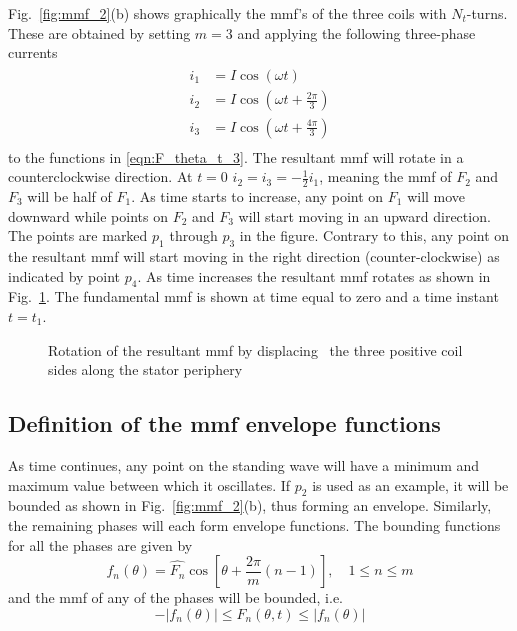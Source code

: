 Fig.~\ref{fig:mmf_2}(b) shows graphically the mmf's of the three coils with $N_t$-turns. These are obtained by setting $m=3$ and applying the following three-phase currents 
\begin{equation}
  \label{eqn:3ph_i}
  \begin{aligned}
   i_1 &= \hat{I}\cos\left(\omega t \right) \\
   i_2 &= \hat{I}\cos\left(\omega t +\frac{2\pi}{3}\right) \\
   i_3 &= \hat{I}\cos\left(\omega t +\frac{4\pi}{3}\right) \\
  \end{aligned}
\end{equation}
to the functions in \eqref{eqn:F_theta_t_3}. The resultant mmf will rotate in a counterclockwise direction. At $t=0$ $i_2=i_3=-\frac{1}{2}i_1$, meaning the mmf of $F_2$ and $F_3$ will be half of $F_1$. As time starts to increase, any point on $F_1$ will move downward while points on $F_2$ and $F_3$ will start moving in an upward direction. The points are marked $p_1$ through $p_3$ in the figure. Contrary to this, any point on the resultant mmf will start moving in the right direction (counter-clockwise) as indicated by point $p_4$. As time increases the resultant mmf rotates as shown in Fig.~\ref{fig:rotating_wave}. The fundamental mmf is shown at time equal to zero and a time instant $t=t_1$.
\begin{figure}
	\centering
		
	\caption[Rotation of the resultant mmf]{Rotation of the resultant mmf by displacing~%
	the three positive coil sides along the stator periphery}
	\label{fig:rotating_wave}
\end{figure}

\subsection{Definition of the mmf envelope functions}\label{subsec:mmf_def}
As time continues, any point on the standing wave will have a minimum and maximum value between which it oscillates. If $p_2$ is used as an example, it will be bounded as shown in Fig.~\ref{fig:mmf_2}(b), thus forming an envelope. Similarly, the remaining phases will each form envelope functions. The bounding functions for all the phases are given by
\begin{equation}
  \label{eqn:f_bound}
  f_n(\theta) = \hat{F_n}\cos\left[\theta+\frac{2\pi}{m}(n-1) \right], 
  \quad 1 \leq n \leq m
\end{equation}
and the mmf of any of the phases will be bounded, i.e. 
\begin{equation}
  -\left|f_n(\theta)\right| \leq F_n(\theta ,t) \leq \left|f_n(\theta)\right|
\end{equation}

